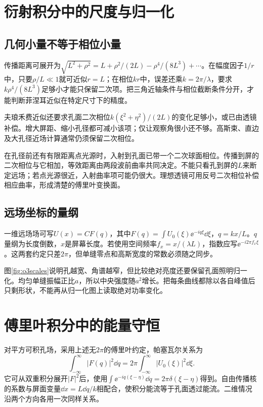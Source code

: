 \section{衍射积分中的尺度与归一化}
\subsection{几何小量不等于相位小量}
传播距离可展开为$\sqrt{L^2+\rho^2}=L+\rho^2/(2L)-\rho^4/(8L^3)+\cdots$。在幅度因子$1/r$中，只要$\rho/L\ll1$就可近似$r=L$；在相位$kr$中，误差还乘$k=2\pi/\lambda$，要求$k\rho^4/(8L^3)$足够小才能只保留二次项。把三角近轴条件与相位截断条件分开，才能判断菲涅耳近似在特定尺寸下的精度。

夫琅禾费近似还要求孔面二次相位$k(\xi^2+\eta^2)/(2L)$的变化足够小，或已由透镜补偿。增大屏距、缩小孔径都可减小该项；仅让观察角很小还不够。高斯束、直边及大孔径近场计算通常仍须保留二次相位。

在孔径前还有有限距离点光源时，入射到孔面已带一个二次球面相位。传播到屏的二次相位与它相加，等效距离由两段波前曲率共同决定。不能只看孔到屏的$L$来断定远场；若点光源很近，入射曲率项可能仍很大。理想透镜可用反号二次相位补偿相应曲率，形成清楚的傅里叶变换面。

\subsection{远场坐标的量纲}
一维远场场可写$U(x)=C F(q)$，其中$F(q)=\int U_0(\xi)\ee^{-iq\xi}\dd\xi$，$q=kx/L$。$q$量纲为长度倒数，$x$是屏幕长度。若使用空间频率$f_x=x/(\lambda L)$，指数应写$\ee^{-i2\pi f_x\xi}$。这两套约定只差$2\pi$，但单缝零点和高斯宽度的常数必须随之同步。

图\ref{fig:o3scales}说明孔越宽、角谱越窄，但比较绝对亮度还要保留孔面照明归一化。均匀单缝振幅正比$a$，所以中央强度随$a^2$增长。把每条曲线都除以各自峰值后只剩形状，不能再从归一化图上读取绝对功率变化。

\section{傅里叶积分中的能量守恒}
对平方可积孔场，采用上述无$2\pi$的傅里叶约定，帕塞瓦尔关系为
\[
 \int_{-\infty}^{\infty}|F(q)|^2\dd q
 =2\pi\int_{-\infty}^{\infty}|U_0(\xi)|^2\dd\xi.
\]
它可从双重积分展开$|F|^2$后，使用$\int\ee^{-iq(\xi-\eta)}\dd q=2\pi\delta(\xi-\eta)$得到。自由传播核的系数与屏面变量$\dd x=L\dd q/k$相配合，使积分能流等于孔面透过能流。二维情况沿两个方向各用一次同样关系。

